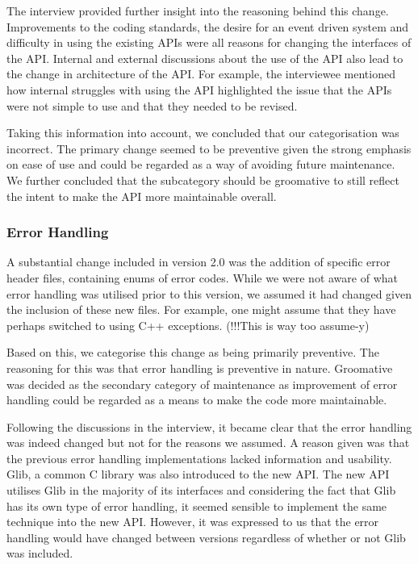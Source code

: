 \documentclass{sig-alternate}
\begin{document}
The interview provided further insight into the reasoning behind this change. Improvements to the coding standards, the desire for an event driven system and difficulty in using the existing APIs were all reasons for changing the interfaces of the API. Internal and external discussions about the use of the API also lead to the change in architecture of the API. For example, the interviewee mentioned how internal struggles with using the API highlighted the issue that the APIs were not simple to use and that they needed to be revised.

Taking this information into account, we concluded that our categorisation was incorrect. The primary change seemed to be preventive given the strong emphasis on ease of use and could be regarded as a way of avoiding future maintenance. We further concluded that the subcategory should be groomative to still reflect the intent to make the API more maintainable overall.


\subsubsection{Error Handling}

A substantial change included in version 2.0 was the addition of specific error header files, containing enums of error codes. While we were not aware of what error handling was utilised prior to this version, we assumed it had changed given the inclusion of these new files. For example, one might assume that they have perhaps switched to using C++ exceptions. (!!!This is way too assume-y)

Based on this, we categorise this change as being primarily preventive. The reasoning for this was that error handling is preventive in nature. Groomative was decided as the secondary category of maintenance as improvement of error handling could be regarded as a means to make the code more maintainable. 

Following the discussions in the interview, it became clear that the error handling was indeed changed but not for the reasons we assumed. A reason given was that the previous error handling implementations lacked information and usability. Glib, a common C library was also introduced to the new API. The new API utilises Glib in the majority of its interfaces and considering the fact that Glib has its own type of error handling, it seemed sensible to implement the same technique into the new API. However, it was expressed to us that the error handling would have changed between versions regardless of whether or not Glib was included.
\end{document}
